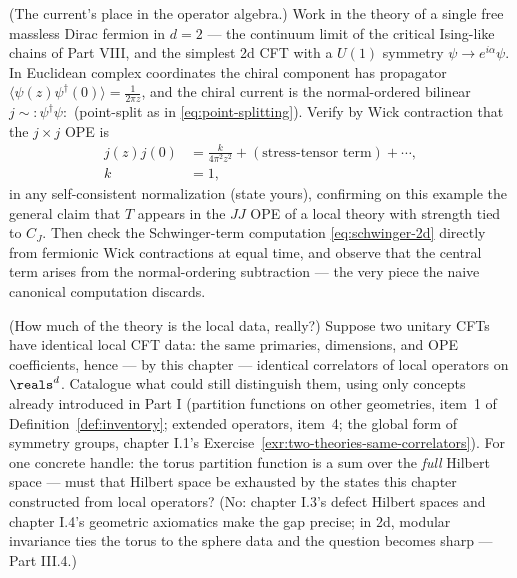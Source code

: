 \begin{exercise}[classic]
\label{exr:current-block}
(The current's place in the operator algebra.) Work in the theory of a
single free massless Dirac fermion in $d = 2$ --- the continuum limit of the
critical Ising-like chains of Part VIII, and the simplest 2d CFT with a
$U(1)$ symmetry $\psi \to e^{i\alpha}\psi$. In Euclidean complex
coordinates the chiral component has propagator $\langle \psi(z)
\psi^\dagger(0)\rangle = \frac{1}{2\pi z}$, and the chiral current is the
normal-ordered bilinear $j \sim {:}\psi^\dagger\psi{:}$ (point-split as in
\eqref{eq:point-splitting}). Verify by Wick contraction that the $j \times
j$ OPE is
\begin{equation*}
\begin{aligned}
j(z) j(0)
&= \frac{k}{4\pi^2 z^2}
+ \left(\text{stress-tensor term}\right) + \cdots,\\
k &= 1,
\end{aligned}
\end{equation*}
in any self-consistent normalization (state yours), confirming on this
example the general claim that $T$ appears in the $JJ$ OPE of a local
theory with strength tied to $C_J$. Then check the Schwinger-term
computation \eqref{eq:schwinger-2d} directly from fermionic Wick contractions
at equal time, and observe that the central term arises from the
normal-ordering subtraction --- the very piece the naive canonical
computation discards.
\end{exercise}

\begin{exercise}[thinker]
\label{exr:data-vs-theory}
(How much of the theory is the local data, really?) Suppose two unitary
CFTs have identical local CFT data: the same primaries, dimensions, and OPE
coefficients, hence --- by this chapter --- identical correlators of local
operators on $\reals^d$. Catalogue what could still distinguish them, using
only concepts already introduced in Part I (partition functions on other
geometries, item~1 of Definition~\ref{def:inventory}; extended operators,
item~4; the global form of symmetry groups, chapter I.1's
Exercise~\ref{exr:two-theories-same-correlators}). For one concrete handle:
the torus partition function is a sum over the \emph{full} Hilbert space ---
must that Hilbert space be exhausted by the states this chapter constructed
from local operators? (No: chapter I.3's defect Hilbert spaces and chapter
I.4's geometric axiomatics make the gap precise; in 2d, modular invariance
ties the torus to the sphere data and the question becomes sharp ---
Part III.4.)
\end{exercise}

